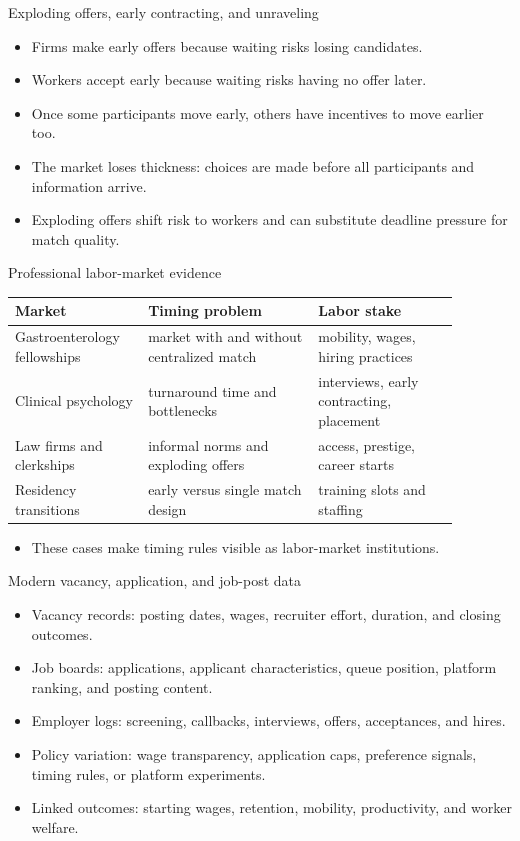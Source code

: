 \documentclass[aspectratio=169,11pt]{beamer}
\begin{document}
\begin{frame}{Exploding offers, early contracting, and unraveling}
\begin{itemize}
    \item Firms make early offers because waiting risks losing candidates.
    \item Workers accept early because waiting risks having no offer later.
    \item Once some participants move early, others have incentives to move earlier too.
    \item The market loses thickness: choices are made before all participants and information arrive.
    \item Exploding offers shift risk to workers and can substitute deadline pressure for match quality.
\end{itemize}
\end{frame}

\begin{frame}{Professional labor-market evidence}
\small
\begin{tabular}{p{0.25\linewidth} p{0.34\linewidth} p{0.29\linewidth}}
\toprule
Market & Timing problem & Labor stake \\
\midrule
Gastroenterology fellowships & market with and without centralized match & mobility, wages, hiring practices \\
Clinical psychology & turnaround time and bottlenecks & interviews, early contracting, placement \\
Law firms and clerkships & informal norms and exploding offers & access, prestige, career starts \\
Residency transitions & early versus single match design & training slots and staffing \\
\bottomrule
\end{tabular}
\vspace{0.2cm}
\begin{itemize}
    \item These cases make timing rules visible as labor-market institutions.
\end{itemize}
\end{frame}

\begin{frame}{Modern vacancy, application, and job-post data}
\begin{itemize}
    \item Vacancy records: posting dates, wages, recruiter effort, duration, and closing outcomes.
    \item Job boards: applications, applicant characteristics, queue position, platform ranking, and posting content.
    \item Employer logs: screening, callbacks, interviews, offers, acceptances, and hires.
    \item Policy variation: wage transparency, application caps, preference signals, timing rules, or platform experiments.
    \item Linked outcomes: starting wages, retention, mobility, productivity, and worker welfare.
\end{itemize}
\end{frame}
\end{document}
